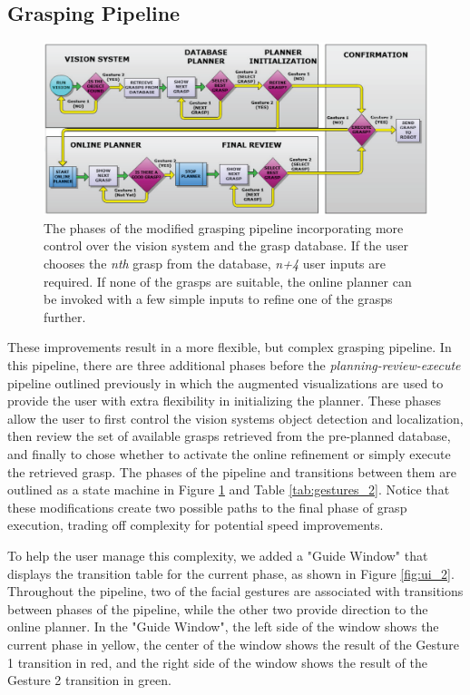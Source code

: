 \subsection{Grasping Pipeline}
\begin{figure}[th!]
	\centering
	\includegraphics[width=1.5\columnwidth]{pipeline_2.png}
	\caption{The phases of the modified grasping pipeline incorporating more control over the vision system and the grasp database. If the user chooses the \emph{nth} grasp from the database, \emph{n+4} user inputs are required. If none of the grasps are suitable, the online planner can be invoked with a few simple inputs to refine one of the grasps further.}
	\label{fig:pipeline_2}
\end{figure}
\label{sec:pipline_2}
These improvements result in a more flexible, but complex grasping pipeline. In this pipeline, there are three additional phases before the  \emph{planning-review-execute} pipeline outlined previously in which the augmented visualizations are used to provide the user with extra flexibility in initializing the planner. These phases allow the user to first control the vision systems object detection and localization, then review the set of available grasps retrieved from the pre-planned database, and finally to chose whether to activate the online refinement or simply execute the retrieved grasp. The phases of the pipeline and transitions between them are outlined as a state machine in Figure \ref{fig:pipeline_2} and Table \ref{tab:gestures_2}. Notice that these modifications create two possible paths to the final phase of grasp execution, trading off complexity for potential speed improvements. 

To help the user manage this complexity, we added a "Guide Window" that displays the transition table for the current phase, as shown in Figure \ref{fig:ui_2}. Throughout the pipeline, two of the facial gestures are associated with transitions between phases of the pipeline, while the other two provide direction to the online planner. In the "Guide Window", the left side of the window shows the current phase in yellow, the center of the window shows the result of the Gesture 1 transition in red, and the right side of the window shows the result of the Gesture 2 transition in green. 

